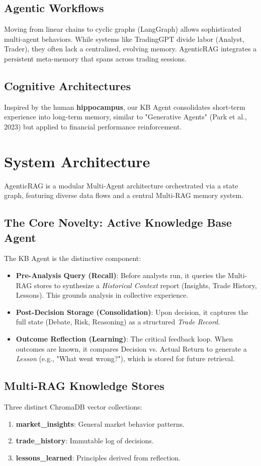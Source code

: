 \documentclass[11pt, a4paper]{article}
\begin{document}
\subsection{Agentic Workflows}
Moving from linear chains to cyclic graphs (LangGraph) allows sophisticated multi-agent behaviors. While systems like TradingGPT divide labor (Analyst, Trader), they often lack a centralized, evolving memory. AgenticRAG integrates a persistent meta-memory that spans across trading sessions.

\subsection{Cognitive Architectures}
Inspired by the human \textbf{hippocampus}, our KB Agent consolidates short-term experience into long-term memory, similar to "Generative Agents" (Park et al., 2023) but applied to financial performance reinforcement.

\section{System Architecture}

AgenticRAG is a modular Multi-Agent architecture orchestrated via a state graph, featuring diverse data flows and a central Multi-RAG memory system.

\subsection{The Core Novelty: Active Knowledge Base Agent}
The KB Agent is the distinctive component:
\begin{itemize}
    \item \textbf{Pre-Analysis Query (Recall)}: Before analysts run, it queries the Multi-RAG stores to synthesize a \textit{Historical Context} report (Insights, Trade History, Lessons). This grounds analysis in collective experience.
    \item \textbf{Post-Decision Storage (Consolidation)}: Upon decision, it captures the full state (Debate, Risk, Reasoning) as a structured \textit{Trade Record}.
    \item \textbf{Outcome Reflection (Learning)}: The critical feedback loop. When outcomes are known, it compares Decision vs. Actual Return to generate a \textit{Lesson} (e.g., "What went wrong?"), which is stored for future retrieval.
\end{itemize}

\subsection{Multi-RAG Knowledge Stores}
Three distinct ChromaDB vector collections:
\begin{enumerate}
    \item \textbf{market\_insights}: General market behavior patterns.
    \item \textbf{trade\_history}: Immutable log of decisions.
    \item \textbf{lessons\_learned}: Principles derived from reflection.
\end{enumerate}
\end{document}
